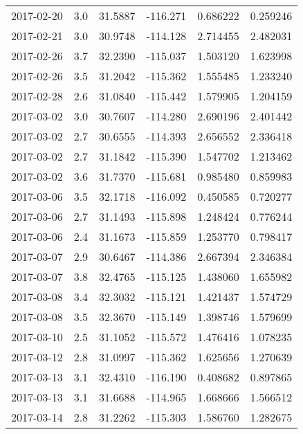 \begin{tabular}{lrrrrr}
2017-02-20 &       3.0 &  31.5887 &  -116.271 &         0.686222 &         0.259246 \\
2017-02-21 &       3.0 &  30.9748 &  -114.128 &         2.714455 &         2.482031 \\
2017-02-26 &       3.7 &  32.2390 &  -115.037 &         1.503120 &         1.623998 \\
2017-02-26 &       3.5 &  31.2042 &  -115.362 &         1.555485 &         1.233240 \\
2017-02-28 &       2.6 &  31.0840 &  -115.442 &         1.579905 &         1.204159 \\
2017-03-02 &       3.0 &  30.7607 &  -114.280 &         2.690196 &         2.401442 \\
2017-03-02 &       2.7 &  30.6555 &  -114.393 &         2.656552 &         2.336418 \\
2017-03-02 &       2.7 &  31.1842 &  -115.390 &         1.547702 &         1.213462 \\
2017-03-02 &       3.6 &  31.7370 &  -115.681 &         0.985480 &         0.859983 \\
2017-03-06 &       3.5 &  32.1718 &  -116.092 &         0.450585 &         0.720277 \\
2017-03-06 &       2.7 &  31.1493 &  -115.898 &         1.248424 &         0.776244 \\
2017-03-06 &       2.4 &  31.1673 &  -115.859 &         1.253770 &         0.798417 \\
2017-03-07 &       2.9 &  30.6467 &  -114.386 &         2.667394 &         2.346384 \\
2017-03-07 &       3.8 &  32.4765 &  -115.125 &         1.438060 &         1.655982 \\
2017-03-08 &       3.4 &  32.3032 &  -115.121 &         1.421437 &         1.574729 \\
2017-03-08 &       3.5 &  32.3670 &  -115.149 &         1.398746 &         1.579699 \\
2017-03-10 &       2.5 &  31.1052 &  -115.572 &         1.476416 &         1.078235 \\
2017-03-12 &       2.8 &  31.0997 &  -115.362 &         1.625656 &         1.270639 \\
2017-03-13 &       3.1 &  32.4310 &  -116.190 &         0.408682 &         0.897865 \\
2017-03-13 &       3.1 &  31.6688 &  -114.965 &         1.668666 &         1.566512 \\
2017-03-14 &       2.8 &  31.2262 &  -115.303 &         1.586760 &         1.282675 \\

\end{tabular}
